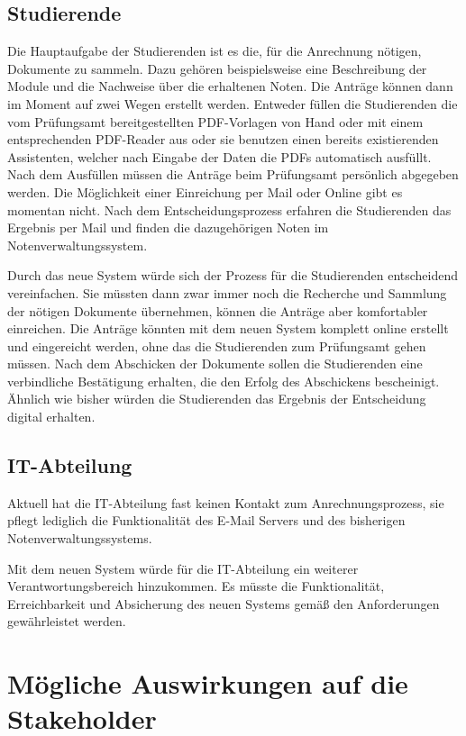 \documentclass[ngerman]{tudscrreprt}
\begin{document}
\subsection{Studierende}

Die Hauptaufgabe der Studierenden ist es die, für die Anrechnung nötigen, Dokumente zu sammeln. Dazu gehören beispielsweise eine Beschreibung der Module und die Nachweise über die erhaltenen Noten. Die Anträge können dann im Moment auf zwei Wegen erstellt werden. Entweder füllen die Studierenden die vom Prüfungsamt bereitgestellten PDF-Vorlagen von Hand oder mit einem entsprechenden PDF-Reader aus oder sie benutzen einen bereits existierenden Assistenten, welcher nach Eingabe der Daten die PDFs automatisch ausfüllt. Nach dem Ausfüllen müssen die Anträge beim Prüfungsamt persönlich abgegeben werden. Die Möglichkeit einer Einreichung per Mail oder Online gibt es momentan nicht. Nach dem Entscheidungsprozess erfahren die Studierenden das Ergebnis per Mail und finden die dazugehörigen Noten im Notenverwaltungssystem.

Durch das neue System würde sich der Prozess für die Studierenden entscheidend vereinfachen. Sie müssten dann zwar immer noch die Recherche und Sammlung der nötigen Dokumente übernehmen, können die Anträge aber komfortabler einreichen. Die Anträge könnten mit dem neuen System komplett online erstellt und eingereicht werden, ohne das die Studierenden zum Prüfungsamt gehen müssen. Nach dem Abschicken der Dokumente sollen die Studierenden eine verbindliche Bestätigung erhalten, die den Erfolg des Abschickens bescheinigt. Ähnlich wie bisher würden die Studierenden das Ergebnis der Entscheidung digital erhalten.

\subsection{IT-Abteilung}

Aktuell hat die IT-Abteilung fast keinen Kontakt zum Anrechnungsprozess, sie pflegt lediglich die Funktionalität des E-Mail Servers und des bisherigen Notenverwaltungssystems.

Mit dem neuen System würde für die IT-Abteilung ein weiterer Verantwortungsbereich hinzukommen. Es müsste die Funktionalität, Erreichbarkeit und Absicherung des neuen Systems gemäß den Anforderungen gewährleistet werden.

\section{Mögliche Auswirkungen auf die Stakeholder}
\end{document}
